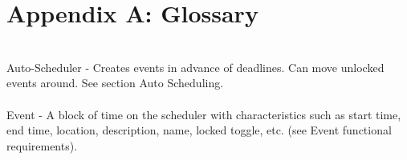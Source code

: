 \documentclass{scrreprt}
\begin{document}
\chapter{Appendix A: Glossary}
\\
Auto-Scheduler - Creates events in advance of deadlines. Can move unlocked events around.
See section Auto Scheduling.\\
\\
Event - A block of time on the scheduler with characteristics such as start time, end time,
location, description, name, locked toggle, etc. (see Event functional requirements).\\
\\
\end{document}
